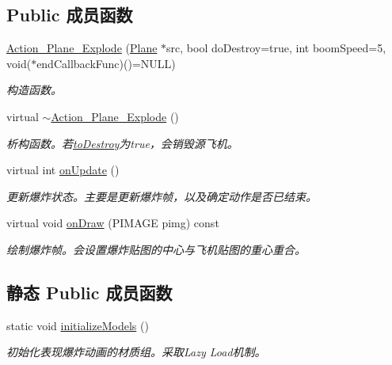 \subsection*{Public 成员函数}
\begin{DoxyCompactItemize}
\item 
\hyperlink{class_action___plane___explode_aa7aeb998cd636ad6d0b42d9e23a43b57}{Action\+\_\+\+Plane\+\_\+\+Explode} (\hyperlink{class_plane}{Plane} $\ast$src, bool do\+Destroy=true, int boom\+Speed=5, void($\ast$end\+Callback\+Func)()=N\+U\+LL)
\begin{DoxyCompactList}\small\item\em 构造函数。 \end{DoxyCompactList}\item 
\mbox{\label{class_action___plane___explode_a1cfe86e64ece12731955275b8d6b9a41}} 
virtual \hyperlink{class_action___plane___explode_a1cfe86e64ece12731955275b8d6b9a41}{$\sim$\+Action\+\_\+\+Plane\+\_\+\+Explode} ()
\begin{DoxyCompactList}\small\item\em 析构函数。若\hyperlink{class_action___plane___explode_a655f5cf52656c4ce16040d2310494029}{to\+Destroy}为true，会销毁源飞机。 \end{DoxyCompactList}\item 
\mbox{\label{class_action___plane___explode_a1786450893420df4539056e93dcdc3b6}} 
virtual int \hyperlink{class_action___plane___explode_a1786450893420df4539056e93dcdc3b6}{on\+Update} ()
\begin{DoxyCompactList}\small\item\em 更新爆炸状态。主要是更新爆炸帧，以及确定动作是否已结束。 \end{DoxyCompactList}\item 
\mbox{\label{class_action___plane___explode_a8436b3848df9d2f27434d5b7bebea525}} 
virtual void \hyperlink{class_action___plane___explode_a8436b3848df9d2f27434d5b7bebea525}{on\+Draw} (P\+I\+M\+A\+GE pimg) const
\begin{DoxyCompactList}\small\item\em 绘制爆炸帧。会设置爆炸贴图的中心与飞机贴图的重心重合。 \end{DoxyCompactList}\end{DoxyCompactItemize}
\subsection*{静态 Public 成员函数}
\begin{DoxyCompactItemize}
\item 
static void \hyperlink{class_action___plane___explode_a797e8de15934ea7370086bde4cc45015}{initialize\+Models} ()
\begin{DoxyCompactList}\small\item\em 初始化表现爆炸动画的材质组。采取\+Lazy Load机制。 \end{DoxyCompactList}\end{DoxyCompactItemize}
